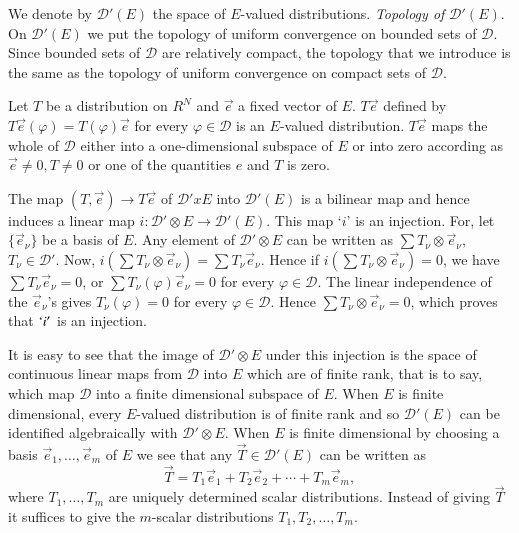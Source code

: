 We denote by $\mathscr{D}' (E)$ the space of $E$-valued distributions.
\textit{Topology of $\mathscr{D}' (E)$}. On $\mathscr{D}' (E)$ we
put the topology of uniform convergence on bounded sets of
$\mathscr{D}$. Since bounded sets of $\mathscr{D}$ are relatively
compact, the topology that we introduce is the same as the topology of
uniform convergence on compact sets of $\mathscr{D}$. 

\medskip
{}

Let $T$ be a distribution on $R^N$ and $\overrightarrow{e}$ a fixed vector of
$E$. $T \overrightarrow{e}$ defined by $T \overrightarrow{e}(\varphi)
= T(\varphi) \overrightarrow{e}$
for every $\varphi \in \mathscr{D}$ is an $E$-valued distribution. $T
\overrightarrow{e}$ maps the whole of $\mathscr{D}$ either into a one-dimensional
subspace of $E$ or into zero according as $\overrightarrow{e} \neq 0, T\neq 0$ or
one of the quantities $e$ and $T$ is zero.

The map $(T, \overrightarrow{e}) \to T\overrightarrow{e}$ of $\mathscr{D}'x E$ into
$\mathscr{D}'(E)$ is a bilinear map and hence induces a linear map
$i:\mathscr{D}'\otimes E \to \mathscr{D}'(E)$. This map `$i$' is an
injection. For, let $\{\overrightarrow{e}_\nu\}$ be a basis of $E$. Any element
of $\mathscr{D}'\otimes E$ can be written as $\sum T_\nu \otimes
\overrightarrow{e}_\nu$, $T_\nu \in \mathscr{D}'$. Now, $i(\sum T_\nu
\otimes \overrightarrow{e}_\nu)=\sum T_\nu\overrightarrow{e}_\nu$.
 Hence if $i(\sum T_\nu \otimes \overrightarrow{e}_\nu) = 0$,
we have $\sum T_\nu \overrightarrow{e}_\nu = 0$, or $\sum T_\nu(\varphi)
\overrightarrow{e}_\nu = 0$ for every $\varphi \in \mathscr{D}$. The linear
independence of the $\overrightarrow{e}_\nu$'s gives $T_\nu(\varphi)=0$ for every
$\varphi \in \mathscr{D}$. Hence $\sum T_\nu \otimes \overrightarrow{e}_\nu = 0$,
which proves that $`i'$ is an injection.

It is easy to see that the image of $\mathscr{D}' \otimes E$ under
this injection is the space of continuous linear maps from
$\mathscr{D}$ into $E$ which are of finite rank, that is to say, which
map $\mathscr{D}$ into a finite dimensional subspace of $E$. When $E$
is finite dimensional, every $E$-valued distribution is of finite rank
and so $\mathscr{D}'(E)$ can be identified algebraically with\pageoriginale
$\mathscr{D}'\otimes E$. When $E$ is finite dimensional by choosing a
basis $\overrightarrow{e}_1,\ldots, \overrightarrow{e}_m$ of $E$ we see
that any  $\overrightarrow{T}\in\mathscr{D}'(E)$ can be written as 
$$
\overrightarrow{T}=T_1 \overrightarrow{e}_1+T_2 \overrightarrow{e}_2+ 
\cdots+ T_m\overrightarrow{e}_m,
$$
where $T_1,\ldots, T_m$ are uniquely determined scalar
distributions. Instead of giving $\overrightarrow{T}$ it suffices to
give the $m$-scalar distributions $T_1, T_2,\ldots,T_m$.

